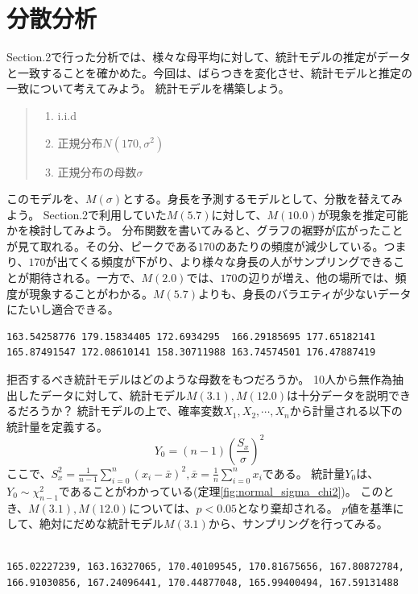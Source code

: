 \chapter{分散分析}
Section.2で行った分析では、様々な母平均に対して、統計モデルの推定がデータと一致することを確かめた。今回は、ばらつきを変化させ、統計モデルと推定の一致について考えてみよう。
統計モデルを構築しよう。
\begin{quote}
    \begin{enumerate}[(1)]
\item i.i.d
\item 正規分布$N(170,\sigma^2)$
\item 正規分布の母数$\sigma$
\end{enumerate}
\end{quote}
このモデルを、$M(\sigma)$とする。身長を予測するモデルとして、分散を替えてみよう。
Section.2で利用していた$M(5.7)$に対して、$M(10.0)$が現象を推定可能かを検討してみよう。
分布関数を書いてみると、グラフの裾野が広がったことが見て取れる。その分、ピークである$170$のあたりの頻度が減少している。つまり、$170$が出てくる頻度が下がり、より様々な身長の人がサンプリングできることが期待される。一方で、$M(2.0)$では、$170$の辺りが増え、他の場所では、頻度が現象することがわかる。$M(5.7)$よりも、身長のバラエティが少ないデータにたいし適合できる。


\begin{lstlisting}
163.54258776 179.15834405 172.6934295  166.29185695 177.65182141 165.87491547 172.08610141 158.30711988 163.74574501 176.47887419
\end{lstlisting}




拒否するべき統計モデルはどのような母数をもつだろうか。
10人から無作為抽出したデータに対して、統計モデル$M(3.1),M(12.0)$は十分データを説明できるだろうか？
統計モデルの上で、確率変数$X_1,X_2,\cdots,X_n$から計量される以下の統計量を定義する。
$$
Y_0=(n-1)\left(\frac{S_x}{\sigma}\right)^2
$$
ここで、$S_x^2=\frac{1}{n-1}\sum_{i=0}^{n}(x_i-\bar{x})^2,\bar{x}=\frac{1}{n}\sum_{i=0}^{n}x_i$である。
統計量$Y_0$は、$Y_0\sim\chi^2_{n-1}$であることがわかっている(定理\ref{fig:normal_sigma_chi2})。
このとき、$M(3.1),M(12.0)$については、$p<0.05$となり棄却される。
$p$値を基準にして、絶対にだめな統計モデル$M(3.1)$から、サンプリングを行ってみる。
\begin{lstlisting}

165.02227239, 163.16327065, 170.40109545, 170.81675656, 167.80872784, 166.91030856, 167.24096441, 170.44877048, 165.99400494, 167.59131488
\end{lstlisting}


